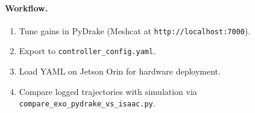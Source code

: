 \documentclass[11pt,a4paper]{article}
\begin{document}
\paragraph{Workflow.}
\begin{enumerate}[leftmargin=2em]
  \item Tune gains in PyDrake (Meshcat at \texttt{http://localhost:7000}).
  \item Export to \texttt{controller\_config.yaml}.
  \item Load YAML on Jetson Orin for hardware deployment.
  \item Compare logged trajectories with simulation via
        \texttt{compare\_exo\_pydrake\_vs\_isaac.py}.
\end{enumerate}
\end{document}
